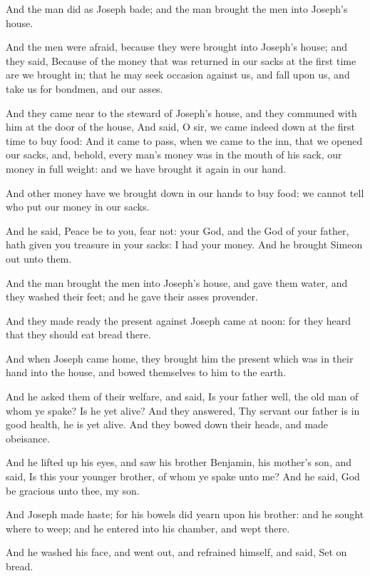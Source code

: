 \Verse And the man did as Joseph bade; and the man brought the men into Joseph's house.

\Verse And the men were afraid, because they were brought into Joseph's house; and they said, Because of the money that was returned in our sacks at the first time are we brought in; that he may seek occasion against us, and fall upon us, and take us for bondmen, and our asses.

\Verse And they came near to the steward of Joseph's house, and they communed with him at the door of the house, \Verse And said, O sir, we came indeed down at the first time to buy food: \Verse And it came to pass, when we came to the inn, that we opened our sacks, and, behold, every man's money was in the mouth of his sack, our money in full weight: and we have brought it again in our hand.

\Verse And other money have we brought down in our hands to buy food: we cannot tell who put our money in our sacks.

\Verse And he said, Peace be to you, fear not: your God, and the God of your father, hath given you treasure in your sacks: I had your money.  And he brought Simeon out unto them.

\Verse And the man brought the men into Joseph's house, and gave them water, and they washed their feet; and he gave their asses provender.

\Verse And they made ready the present against Joseph came at noon: for they heard that they should eat bread there.

\Verse And when Joseph came home, they brought him the present which was in their hand into the house, and bowed themselves to him to the earth.

\Verse And he asked them of their welfare, and said, Is your father well, the old man of whom ye spake? Is he yet alive?  \Verse And they answered, Thy servant our father is in good health, he is yet alive.  And they bowed down their heads, and made obeisance.

\Verse And he lifted up his eyes, and saw his brother Benjamin, his mother's son, and said, Is this your younger brother, of whom ye spake unto me? And he said, God be gracious unto thee, my son.

\Verse And Joseph made haste; for his bowels did yearn upon his brother: and he sought where to weep; and he entered into his chamber, and wept there.

\Verse And he washed his face, and went out, and refrained himself, and said, Set on bread.


